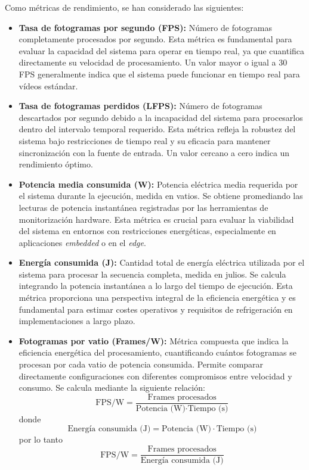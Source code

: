 \documentclass[11pt,spanish,listoffigures,listoftables]{tfgetsinf}
\begin{document}
Como métricas de rendimiento, se han considerado las siguientes:
\begin{itemize}
   \item \textbf{Tasa de fotogramas por segundo (FPS):} Número de fotogramas completamente procesados por segundo. Esta métrica es fundamental para evaluar la capacidad del sistema para operar en tiempo real, ya que cuantifica directamente su velocidad de procesamiento. Un valor mayor o igual a 30 FPS generalmente indica que el sistema puede funcionar en tiempo real para vídeos estándar.

      \item \textbf{Tasa de fotogramas perdidos (LFPS):} Número de fotogramas descartados por segundo debido a la incapacidad del sistema para procesarlos dentro del intervalo temporal requerido. Esta métrica refleja la robustez del sistema bajo restricciones de tiempo real y su eficacia para mantener sincronización con la fuente de entrada. Un valor cercano a cero indica un rendimiento óptimo.

      \item \textbf{Potencia media consumida (W):} Potencia eléctrica media requerida por el sistema durante la ejecución, medida en vatios. Se obtiene promediando las lecturas de potencia instantánea registradas por las herramientas de monitorización hardware. Esta métrica es crucial para evaluar la viabilidad del sistema en entornos con restricciones energéticas, especialmente en aplicaciones \textit{embedded} o en el \textit{edge}.

      \item \textbf{Energía consumida (J):} Cantidad total de energía eléctrica utilizada por el sistema para procesar la secuencia completa, medida en julios. Se calcula integrando la potencia instantánea a lo largo del tiempo de ejecución. Esta métrica proporciona una perspectiva integral de la eficiencia energética y es fundamental para estimar costes operativos y requisitos de refrigeración en implementaciones a largo plazo.

      \item \textbf{Fotogramas por vatio (Frames/W):} Métrica compuesta que indica la eficiencia energética del procesamiento, cuantificando cuántos fotogramas se procesan por cada vatio de potencia consumida. Permite comparar directamente configuraciones con diferentes compromisos entre velocidad y consumo. Se calcula mediante la siguiente relación:
      \begin{equation}
         \text{FPS/W} = \frac{\text{Frames procesados}}{\text{Potencia (W)} \cdot \text{Tiempo (s)}}
      \end{equation}
      donde
      \begin{equation}
         \text{Energía consumida (J)} = \text{Potencia (W)} \cdot \text{Tiempo (s)}
      \end{equation}
      por lo tanto
      \begin{equation}
         \text{FPS/W} = \frac{\text{Frames procesados}}{\text{Energía consumida (J)}}
      \end{equation}
      

\end{itemize}
\end{document}
